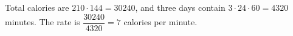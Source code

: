 Total calories are $210\cdot144=30240$, and three days contain $3\cdot24\cdot60=4320$ minutes. The rate is $\dfrac{30240}{4320}=\boxed7$ calories per minute.
